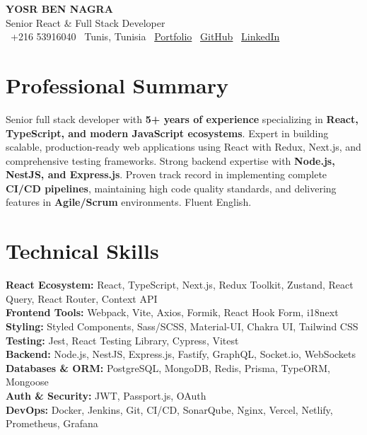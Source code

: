 \documentclass[10pt,a4paper]{article}
\begin{document}
\begin{center}
  {\Large\bfseries\color{primary} YOSR BEN NAGRA}\\[2pt]
  {\small\color{darkgray} Senior React \& Full Stack Developer}\\[3pt]
  {\footnotesize
    \faPhone\ +216 53916040 \quad
    \faMapMarker*\ Tunis, Tunisia \quad
    \faGlobe\ \href{https://portfolio-yosr.vercel.app/en}{Portfolio} \quad
    \faGithub\ \href{https://github.com/YosrBennagra}{GitHub} \quad
    \faLinkedin\ \href{https://www.linkedin.com/in/yosr-ben-nagra/}{LinkedIn}
  }
\end{center}

\vspace{3pt}

\section*{Professional Summary}
\vspace{1pt}
{\small
Senior full stack developer with \textbf{5+ years of experience} specializing in \textbf{React, TypeScript, and modern JavaScript ecosystems}. Expert in building scalable, production-ready web applications using React with Redux, Next.js, and comprehensive testing frameworks. Strong backend expertise with \textbf{Node.js, NestJS, and Express.js}. Proven track record in implementing complete \textbf{CI/CD pipelines}, maintaining high code quality standards, and delivering features in \textbf{Agile/Scrum} environments. Fluent English.
}

\vspace{3pt}

\section*{Technical Skills}
\vspace{2pt}
{\small
\textbf{React Ecosystem:} React, TypeScript, Next.js, Redux Toolkit, Zustand, React Query, React Router, Context API\\[2pt]
\textbf{Frontend Tools:} Webpack, Vite, Axios, Formik, React Hook Form, i18next\\[2pt]
\textbf{Styling:} Styled Components, Sass/SCSS, Material-UI, Chakra UI, Tailwind CSS\\[2pt]
\textbf{Testing:} Jest, React Testing Library, Cypress, Vitest\\[2pt]
\textbf{Backend:} Node.js, NestJS, Express.js, Fastify, GraphQL, Socket.io, WebSockets\\[2pt]
\textbf{Databases \& ORM:} PostgreSQL, MongoDB, Redis, Prisma, TypeORM, Mongoose\\[2pt]
\textbf{Auth \& Security:} JWT, Passport.js, OAuth\\[2pt]
\textbf{DevOps:} Docker, Jenkins, Git, CI/CD, SonarQube, Nginx, Vercel, Netlify, Prometheus, Grafana
}
\end{document}
